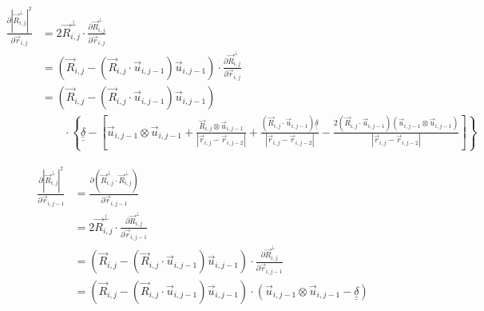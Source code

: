 \documentclass{article}
\renewcommand{\ij}{_{i,j}}
\newcommand{\ijj}{_{i,j-1}}
\newcommand{\ijjj}{_{i,j-2}}
\newcommand{\magn}[1]{\left\vert #1 \right\vert }
\renewcommand{\part}[2]{\frac{\partial #1 }{\partial #2}}
\newcommand{\ten}[1]{\underline{\underline{#1}}}
\newcommand{\rij}{\vec{r} \ij}
\newcommand{\Rij}{\vec{R} \ij}
\newcommand{\rijj}{\vec{r} \ijj}
\newcommand{\rijjj}{\vec{r} \ijjj}
\newcommand{\uijj}{\vec{u} \ijj}
\begin{document}
\begin{align*}
  \part{
    \magn{\Rij^\perp}^2
  }{ \rij }
  &= 
  2 \Rij^\perp \cdot \part{\Rij^\perp}{\rij} 
  \\
  &= 
  \left(
  \vec{R} \ij 
  - 
  \left(\vec{R} \ij \cdot \vec{u} \ijj \right) 
  \vec{u} \ijj 
  \right)
  \cdot 
  \part{\Rij^\perp}{\rij}
  \\
  &= 
  \left(
  \vec{R} \ij 
  - 
  \left(\vec{R} \ij \cdot \vec{u} \ijj \right) 
  \vec{u} \ijj 
  \right)
  \\
  &
  \qquad
  \cdot 
  \left\{
  \ten{\delta} 
  -
  \left[
  \uijj \otimes \uijj
  + 
  \frac{\Rij \otimes \uijj }{\magn{\rij - \rijjj}} 
  +
  \frac{ \left( 
    \Rij \cdot \uijj
    \right) \ten{\delta}}{\magn{\rij - \rijjj}}
  -
  \frac{
    2 \left(
      \Rij \cdot \uijj 
    \right)
    \left(\uijj \otimes \uijj 
    \right)
    }{\magn{\rij - \rijjj}}
  \right]
  \right\}
\end{align*}



\begin{align*}
  \part{
    \magn{\Rij^\perp}^2
  }{ \rijj }
  &=
  \part{\left(
    \Rij^\perp \cdot \Rij^\perp 
    \right)
  }{ \rijj }
  \\
  &= 
  2 \Rij^\perp \cdot \part{\Rij^\perp}{\rijj}
  \\
  &= 
  \left(
  \vec{R} \ij 
  - 
  \left(\vec{R} \ij \cdot \vec{u} \ijj \right) 
  \vec{u} \ijj 
  \right)
  \cdot 
  \part{\Rij^\perp}{\rijj}
  \\
  &= 
  \left(
  \vec{R} \ij 
  - 
  \left(\vec{R} \ij \cdot \vec{u} \ijj \right) 
  \vec{u} \ijj 
  \right)
  \cdot
  \left(
  \uijj \otimes \uijj 
  -
  \ten{\delta} 
  \right)
\end{align*}
\end{document}
